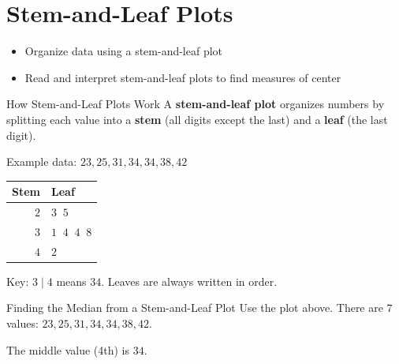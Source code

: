 \section{Stem-and-Leaf Plots}

\begin{learningGoals}
\begin{itemize}
    \item Organize data using a stem-and-leaf plot
    \item Read and interpret stem-and-leaf plots to find measures of center
\end{itemize}
\end{learningGoals}

\begin{conceptBox}{How Stem-and-Leaf Plots Work}
A \textbf{stem-and-leaf plot} organizes numbers by splitting each value into a \textbf{stem} (all digits except the last) and a \textbf{leaf} (the last digit).

Example data: $23, 25, 31, 34, 34, 38, 42$

\begin{center}
\begin{tabular}{r|l}
    \textbf{Stem} & \textbf{Leaf} \\
    \hline
    $2$ & $3\;\;5$ \\
    $3$ & $1\;\;4\;\;4\;\;8$ \\
    $4$ & $2$
\end{tabular}
\end{center}
Key: $3 \mid 4$ means $34$. Leaves are always written in order.
\end{conceptBox}

\begin{workedExample}{Finding the Median from a Stem-and-Leaf Plot}
Use the plot above. There are $7$ values: $23, 25, 31, 34, 34, 38, 42$.

The middle value (4th) is $34$.
\end{workedExample}


